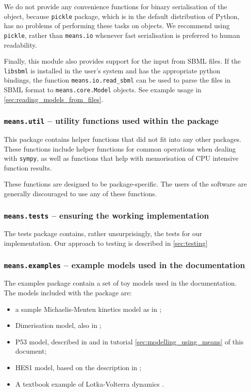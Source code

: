 We do not provide any convenience functions for binary serialisation of the object, because \verb`pickle` package,
which is in the default distribution of Python, has no problems of performing these tasks on \means objects. 
We recommend using \verb`pickle`, rather than \verb`means.io` whenever fast serialisation is preferred to human
readability.

Finally, this module also provides support for the input from SBML files\cite{hucka_systems_2003}.
If the \verb`libsbml` is installed in the user's system and has the appropriate python bindings, the function \verb`means.io.read_sbml` can be used to parse the files in SBML format
to \verb`means.core.Model` objects. See example usage in \autoref{sec:reading_models_from_files}.

\subsubsection{{\tt means.util} -- utility functions used within the package}
This package contains helper functions that did not fit into any other packages.
These functions include helper functions for common operations when dealing with \verb`sympy`,
as well as functions that help with memorisation of CPU intensive function results.

These functions are designed to be package-specific.
The users of the software are generally discouraged to use any of these functions.

\subsubsection{{\tt means.tests} -- ensuring the working implementation}
The tests package contains, rather unsurprisingly, the tests for our implementation.
Our approach to testing is described in \autoref{sec:testing}

\subsubsection{{\tt means.examples} -- example models used in the documentation}
The examples package contain a set of toy models used in the documentation.
The models included with the package are:
\begin{itemize}
    \item a sample Michaelis-Menten kinetics model as in \cite{ale_general_2013};
    \item Dimerisation model, also in \cite{ale_general_2013};
    \item P53 model, described in \cite{ale_general_2013} and in tutorial \autoref{sec:modelling_using_means} of this document;
    \item HES1 model, based on the description in \cite{ale_general_2013};
    \item A textbook example of Lotka-Volterra dynamics \cite{billard_lotka-volterra_1977}.
\end{itemize}


